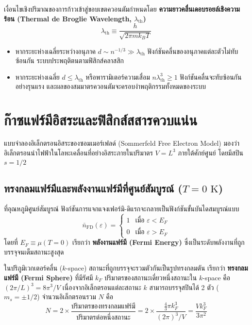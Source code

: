เงื่อนไขเชิงปริมาณของการก้าวเข้าสู่ขอบเขตควอนตัมกำหนดโดย \textbf{ความยาวคลื่นเดอบรอยล์เชิงความร้อน (Thermal de Broglie Wavelength, $\lambda_{\text{th}}$)}
\begin{equation}
\lambda_{\text{th}} \equiv \frac{h}{\sqrt{2\pi m k_B T}}
\label{eq:thermal_debroglie}
\end{equation}
\begin{itemize}
    \item หากระยะห่างเฉลี่ยระหว่างอนุภาค $d \sim n^{-1/3} \gg \lambda_{\text{th}}$ ฟังก์ชันคลื่นของอนุภาคแต่ละตัวไม่ทับซ้อนกัน ระบบประพฤติตนตามฟิสิกส์คลาสสิก
    \item หากระยะห่างเฉลี่ย $d \le \lambda_{\text{th}}$ หรือพารามิเตอร์ความเสื่อม $n \lambda_{\text{th}}^3 \ge 1$ ฟังก์ชันคลื่นจะทับซ้อนกันอย่างรุนแรง และผลของสมมาตรควอนตัมจะครอบงำพฤติกรรมทั้งหมดของระบบ
\end{itemize}

\section{ก๊าซแฟร์มีอิสระและฟิสิกส์สสารควบแน่น}

แบบจำลองอิเล็กตรอนอิสระของซอมเมอร์เฟลด์ (Sommerfeld Free Electron Model) มองว่าอิเล็กตรอนนำไฟฟ้าในโลหะเคลื่อนที่อย่างอิสระภายในปริมาตร $V = L^3$ ภายใต้ศักย์ศูนย์ โดยมีสปิน $s = 1/2$

\subsection{ทรงกลมแฟร์มีและพลังงานแฟร์มีที่ศูนย์สัมบูรณ์ ($T = 0\text{ K}$)}
ที่อุณหภูมิศูนย์สัมบูรณ์ ฟังก์ชันการแจกแจงเฟอร์มิ-ดิแรกจะกลายเป็นฟังก์ชันขั้นบันไดสมบูรณ์แบบ
\begin{equation}
\bar{n}_{\text{FD}}(\varepsilon) = \begin{cases} 1 & \text{เมื่อ } \varepsilon < E_F \\ 0 & \text{เมื่อ } \varepsilon > E_F \end{cases}
\end{equation}
โดยที่ $E_F \equiv \mu(T=0)$ เรียกว่า \textbf{พลังงานแฟร์มี (Fermi Energy)} ซึ่งเป็นระดับพลังงานที่ถูกบรรจุจนเต็มสถานะสูงสุด

ในปริภูมิเวกเตอร์คลื่น ($k$-space) สถานะที่ถูกบรรจุจะรวมตัวกันเป็นรูปทรงกลมตัน เรียกว่า \textbf{ทรงกลมแฟร์มี (Fermi Sphere)} ที่มีรัศมี $k_F$ ปริมาตรของสถานะเดี่ยวหนึ่งสถานะใน $k$-space คือ $(2\pi/L)^3 = 8\pi^3/V$ เนื่องจากอิเล็กตรอนแต่ละสถานะ $k$ สามารถบรรจุสปินได้ 2 ตัว ($m_s = \pm 1/2$) จำนวนอิเล็กตรอนรวม $N$ คือ
\begin{equation}
N = 2 \times \frac{\text{ปริมาตรของทรงกลมแฟร์มี}}{\text{ปริมาตรต่อหนึ่งสถานะ}} = 2 \times \frac{\frac{4}{3}\pi k_F^3}{(2\pi)^3/V} = \frac{V k_F^3}{3\pi^2}
\end{equation}

